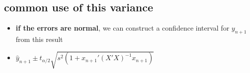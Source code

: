 \subsection{common use of this variance}

\begin{itemize}[leftmargin=0pt]
\item \textbf{if the errors are normal}, we can construct a confidence
       interval for $y_{n+1}$ from this result
\item $\hat y_{n+1} \pm t_{\alpha/2} \sqrt{s^2 (1 + x_{n+1}'(X'X)^{-1}x_{n+1})}$
\end{itemize}

